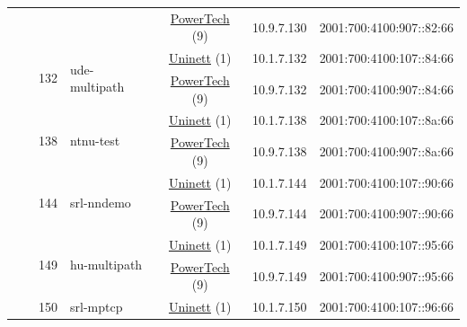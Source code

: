 \begin{small}
\begin{center}
\begin{longtable}{|c|c|c|c|c|c|c|c|}
  &  &  &  & \multicolumn{2}{|c|}{\tiny{\href{http://www.powertech.no}{PowerTech} (9)}} & \tiny{10.9.7.130} & \tiny{2001:700:4100:907::82:66} \\* \cline{3-3}\cline{4-4}\cline{5-5}\cline{6-6}\cline{7-7}\cline{8-8}
  &  & \multirow{2}{*}{\tiny{132}} & \multicolumn{1}{|l|}{\multirow{2}{*}{\tiny{ude-multipath}}} & \multicolumn{2}{|c|}{\tiny{\href{https://www.uninett.no}{Uninett} (1)}} & \tiny{10.1.7.132} & \tiny{2001:700:4100:107::84:66} \\* \cline{5-5}\cline{6-6}\cline{7-7}\cline{8-8}
  &  &  &  & \multicolumn{2}{|c|}{\tiny{\href{http://www.powertech.no}{PowerTech} (9)}} & \tiny{10.9.7.132} & \tiny{2001:700:4100:907::84:66} \\* \cline{3-3}\cline{4-4}\cline{5-5}\cline{6-6}\cline{7-7}\cline{8-8}
  &  & \multirow{2}{*}{\tiny{138}} & \multicolumn{1}{|l|}{\multirow{2}{*}{\tiny{ntnu-test}}} & \multicolumn{2}{|c|}{\tiny{\href{https://www.uninett.no}{Uninett} (1)}} & \tiny{10.1.7.138} & \tiny{2001:700:4100:107::8a:66} \\* \cline{5-5}\cline{6-6}\cline{7-7}\cline{8-8}
  &  &  &  & \multicolumn{2}{|c|}{\tiny{\href{http://www.powertech.no}{PowerTech} (9)}} & \tiny{10.9.7.138} & \tiny{2001:700:4100:907::8a:66} \\* \cline{3-3}\cline{4-4}\cline{5-5}\cline{6-6}\cline{7-7}\cline{8-8}
  &  & \multirow{2}{*}{\tiny{144}} & \multicolumn{1}{|l|}{\multirow{2}{*}{\tiny{srl-nndemo}}} & \multicolumn{2}{|c|}{\tiny{\href{https://www.uninett.no}{Uninett} (1)}} & \tiny{10.1.7.144} & \tiny{2001:700:4100:107::90:66} \\* \cline{5-5}\cline{6-6}\cline{7-7}\cline{8-8}
  &  &  &  & \multicolumn{2}{|c|}{\tiny{\href{http://www.powertech.no}{PowerTech} (9)}} & \tiny{10.9.7.144} & \tiny{2001:700:4100:907::90:66} \\* \cline{3-3}\cline{4-4}\cline{5-5}\cline{6-6}\cline{7-7}\cline{8-8}
  &  & \multirow{2}{*}{\tiny{149}} & \multicolumn{1}{|l|}{\multirow{2}{*}{\tiny{hu-multipath}}} & \multicolumn{2}{|c|}{\tiny{\href{https://www.uninett.no}{Uninett} (1)}} & \tiny{10.1.7.149} & \tiny{2001:700:4100:107::95:66} \\* \cline{5-5}\cline{6-6}\cline{7-7}\cline{8-8}
  &  &  &  & \multicolumn{2}{|c|}{\tiny{\href{http://www.powertech.no}{PowerTech} (9)}} & \tiny{10.9.7.149} & \tiny{2001:700:4100:907::95:66} \\* \cline{3-3}\cline{4-4}\cline{5-5}\cline{6-6}\cline{7-7}\cline{8-8}
  &  & \multirow{2}{*}{\tiny{150}} & \multicolumn{1}{|l|}{\multirow{2}{*}{\tiny{srl-mptcp}}} & \multicolumn{2}{|c|}{\tiny{\href{https://www.uninett.no}{Uninett} (1)}} & \tiny{10.1.7.150} & \tiny{2001:700:4100:107::96:66} \\* \cline{5-5}\cline{6-6}\cline{7-7}\cline{8-8}

\end{longtable}
\end{center}
\end{small}
